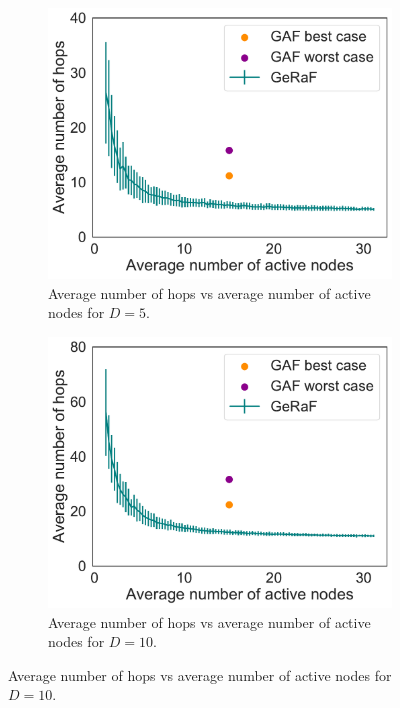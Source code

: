 \documentclass[twoside,onecolumn]{article}
\theoremstyle{definition}
\begin{document}
\begin{figure} \centering
\begin{subfigure}{0.45\textwidth}
         \includegraphics[width=\textwidth]{../multihop_GeRaF/figures/multihop_GeRaF_N100_distance5.pdf}
         \caption{Average number of hops vs average number of active nodes for $D=5$.}\label{fig:gaf5}
     \end{subfigure}
     \quad
     \begin{subfigure}{0.45\textwidth}
         \includegraphics[width=\textwidth]{../multihop_GeRaF/figures/multihop_GeRaF_N100_distance10.pdf}
         \caption{Average number of hops vs average number of active nodes for $D=10$.}\label{fig:gaf10}
     \end{subfigure}
     

\end{figure}
\end{document}
